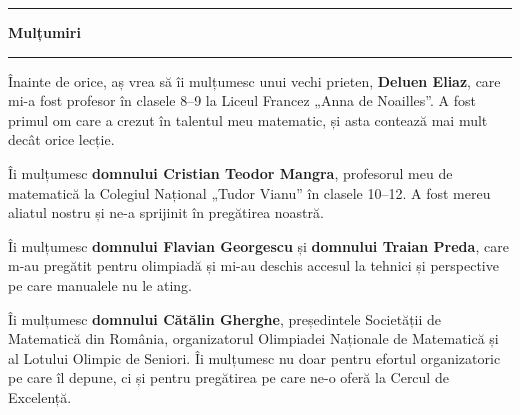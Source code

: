 \thispagestyle{empty}
\vspace*{1.5cm}
{\noindent\color{onm}\rule{\linewidth}{3pt}}\par\vspace{3mm}
{\noindent\fontsize{28}{32}\selectfont\bfseries\color{ink} Mulțumiri}\par\vspace{3mm}
{\noindent\color{onm}\rule{\linewidth}{3pt}}\par\vspace{8mm}

\noindent Înainte de orice, aș vrea să îi mulțumesc unui vechi prieten, \textbf{Deluen Eliaz}, care mi-a fost profesor în clasele 8--9 la Liceul Francez „Anna de Noailles''. A fost primul om care a crezut în talentul meu matematic, și asta contează mai mult decât orice lecție.

\medskip
\noindent Îi mulțumesc \textbf{domnului Cristian Teodor Mangra}, profesorul meu de matematică la Colegiul Național „Tudor Vianu'' în clasele 10--12. A fost mereu aliatul nostru și ne-a sprijinit în pregătirea noastră.

\medskip
\noindent Îi mulțumesc \textbf{domnului Flavian Georgescu} și \textbf{domnului Traian Preda}, care m-au pregătit pentru olimpiadă și mi-au deschis accesul la tehnici și perspective pe care manualele nu le ating.

\medskip
\noindent Îi mulțumesc \textbf{domnului Cătălin Gherghe}, președintele Societății de Matematică din România, organizatorul Olimpiadei Naționale de Matematică și al Lotului Olimpic de Seniori. Îi mulțumesc nu doar pentru efortul organizatoric pe care îl depune, ci și pentru pregătirea pe care ne-o oferă la Cercul de Excelență.

